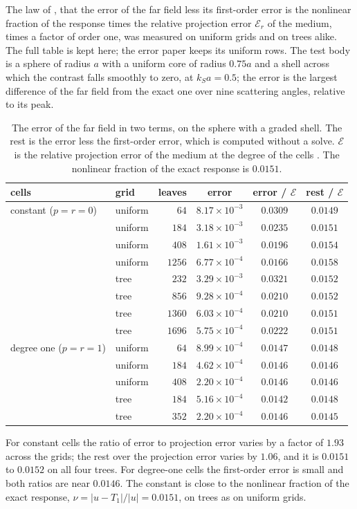 \documentclass[11pt,a4paper]{article}
\newcommand{\cE}{\mathcal{E}}
\begin{document}
The law of \citet{NestorError2026}, that the error of the far field less its first-order error is the
nonlinear fraction of the response times the relative projection error $\cE_r$ of the medium, times a
factor of order one, was measured on uniform grids and on trees alike. The full table is kept here; the
error paper keeps its uniform rows. The test body is a sphere of radius $a$ with a uniform core of radius
$0.75a$ and a shell across which the contrast falls smoothly to zero, at $k_Sa=0.5$; the error is the
largest difference of the far field from the exact one over nine scattering angles, relative to its peak.
\begin{table}[htbp]
\centering
\caption{The error of the far field in two terms, on the sphere with a graded shell. The rest is the
error less the first-order error, which is computed without a solve. $\cE$ is the relative projection
error of the medium at the degree of the cells \citep{NestorError2026}. The nonlinear fraction of the exact response
is $0.0151$.}\label{tab:twoterm}
\small
\begin{tabular}{@{}llrccc@{}}
\toprule
cells & grid & leaves & error & error / $\cE$ & rest / $\cE$ \\
\midrule
constant ($p=r=0$) & uniform & $64$   & $8.17\times10^{-3}$ & $0.0309$ & $0.0149$ \\
 & uniform & $184$  & $3.18\times10^{-3}$ & $0.0235$ & $0.0151$ \\
 & uniform & $408$  & $1.61\times10^{-3}$ & $0.0196$ & $0.0154$ \\
 & uniform & $1256$ & $6.77\times10^{-4}$ & $0.0166$ & $0.0158$ \\
 & tree    & $232$  & $3.29\times10^{-3}$ & $0.0321$ & $0.0152$ \\
 & tree    & $856$  & $9.28\times10^{-4}$ & $0.0210$ & $0.0152$ \\
 & tree    & $1360$ & $6.03\times10^{-4}$ & $0.0210$ & $0.0151$ \\
 & tree    & $1696$ & $5.75\times10^{-4}$ & $0.0222$ & $0.0151$ \\
\midrule
degree one ($p=r=1$) & uniform & $64$  & $8.99\times10^{-4}$ & $0.0147$ & $0.0148$ \\
 & uniform & $184$ & $4.62\times10^{-4}$ & $0.0146$ & $0.0146$ \\
 & uniform & $408$ & $2.20\times10^{-4}$ & $0.0146$ & $0.0146$ \\
 & tree    & $184$ & $5.16\times10^{-4}$ & $0.0142$ & $0.0148$ \\
 & tree    & $352$ & $2.20\times10^{-4}$ & $0.0146$ & $0.0145$ \\
\bottomrule
\end{tabular}
\end{table}
For constant cells the ratio of error to projection error varies by a factor of $1.93$ across the
grids; the rest over the projection error varies by $1.06$, and it is $0.0151$ to $0.0152$ on all four
trees. For degree-one cells the first-order error is small and both ratios are near $0.0146$. The constant
is close to the nonlinear fraction of the exact response, $\nu=\lvert u-T_1\rvert/\lvert u\rvert=0.0151$, on trees as on uniform grids.
\end{document}
